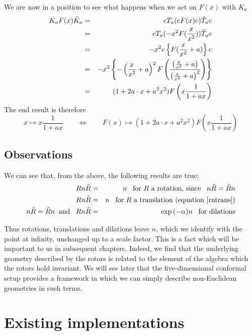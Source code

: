 %
We are now in a position to see what happens when we act
on $F(x)$ with $K_a$
%
\begin{eqnarray}
 K_a F(x) \tilde{K}_a & = & eT_a(eF(x)e)\tilde{T}_a e \nonumber \\
               & = & eT_a( - x^2 F(\frac{x}{x^2}))\tilde{T}_a e \nonumber \\
       & = &  -x^2 e\left\{ F(\frac{x}{x^2} +a)\right\} e \nonumber \\
& = & -x^2\left\{- \left(\frac{x}{x^2} + a\right)^2
F\left(\frac{\left(
\frac{x}{x^2} + a\right)}{\left(\frac{x}{x^2} + a\right)^2}\right)\right\} \nonumber \\
          & = & (1 + 2a\cdot x + a^2x^2)F\left( x\frac{1}{1+ax}\right)
\end{eqnarray}
%
The end result is therefore
%
\begin{equation}
x\mapsto x\frac{1}{1+ax}  \qquad \Leftrightarrow \qquad  F(x)
\mapsto (1+2a\cdot x + a^2x^2)F\left(x\frac{1}{1+ax}\right)
\end{equation}
%

%
\subsection{Observations}
We can see that, from the above, the following results are true:
%
\begin{eqnarray}
R n \tilde{R} &  =  &   n \;\;\; \mbox{for $R$ a
rotation, since} \;\;\; n\tilde{R}=\tilde{R}n
 \nonumber \\
 R n \tilde{R} &  =  &   n \;\;\; \mbox{for $R$ a
translation (equation~\ref{rntrans}}) \nonumber \\
n\tilde{R}=\tilde{R}n \;\;\mbox{and}\;\;\; R n \tilde{R}
& = & \exp{(-\alpha )}n \;\;\;\mbox{for dilations} \nonumber
\end{eqnarray}
%

Thus rotations, translations and dilations leave $n$, which we identify with
the point at infinity, unchanged up to a scale factor. This is a fact which
will be important to us in subsequent chapters. Indeed, we find that the
underlying geometry described by the rotors is related to the element of the
algebra which the rotors hold invariant. We will see later that the five-dimensional
conformal setup provides a framework in which we can simply describe
non-Euclidean geometries in such terms.

\section{Existing implementations}

